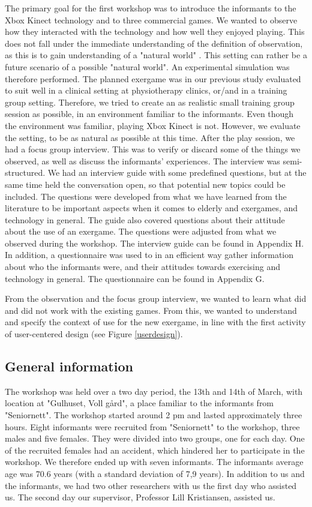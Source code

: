 The primary goal for the first workshop was to introduce the informants to the Xbox Kinect technology and to three commercial games. We wanted to observe how they interacted with the technology and how well they enjoyed playing. This does not fall under the immediate understanding of the definition of observation, as this is to gain understanding of a "natural world" \cite{tjora}. This setting can rather be a future scenario of a possible "natural world".  An experimental simulation was therefore performed. The planned exergame was in our previous study \cite{project} evaluated to suit well in a clinical setting at physiotherapy clinics, or/and in a training group setting. Therefore, we tried to create an as realistic small training group session as possible, in an environment familiar to the informants. Even though the environment was familiar, playing Xbox Kinect is not. However, we evaluate the setting, to be as natural as possible at this time. After the play session, we had a focus group interview. This was to verify or discard some of the things we observed, as well as discuss the informants' experiences. The interview was semi-structured. We had an interview guide with some predefined questions, but at the same time held the conversation open, so that potential new topics could be included. The questions were developed from what we have learned from the literature to be important aspects when it comes to elderly and exergames, and technology in general. The guide also covered questions about their attitude about the use of an exergame. The questions were adjusted from what we observed during the workshop. The interview guide can be found in Appendix H. In addition, a questionnaire was used to in an efficient way gather information about  who the informants were, and their attitudes towards exercising and technology in general. The questionnaire can be found in Appendix G.

From the observation and the focus group interview, we wanted to learn what did and did not work with the existing games. From this, we wanted to understand and specify the context of use for the new exergame, in line with the first activity of user-centered design (see Figure \ref{userdesign}). 

\subsection{General information}
The workshop was held over a two day period, the 13th and 14th of March, with location at "Gulhuset, Voll gård", a place familiar to the informants from "Seniornett". The workshop started around 2 pm and lasted approximately three hours. Eight informants were recruited from "Seniornett" to the workshop, three males and five females. They were divided into two groups, one for each day. One of the recruited females had an accident, which hindered her to participate in the workshop. We therefore ended up with seven informants. The informants average age was 70.6 years (with a standard deviation of 7,9 years). In addition to us and the informants, we had two other researchers with us the first day who assisted us. The second day our supervisor, Professor Lill Kristiansen, assisted us. 

